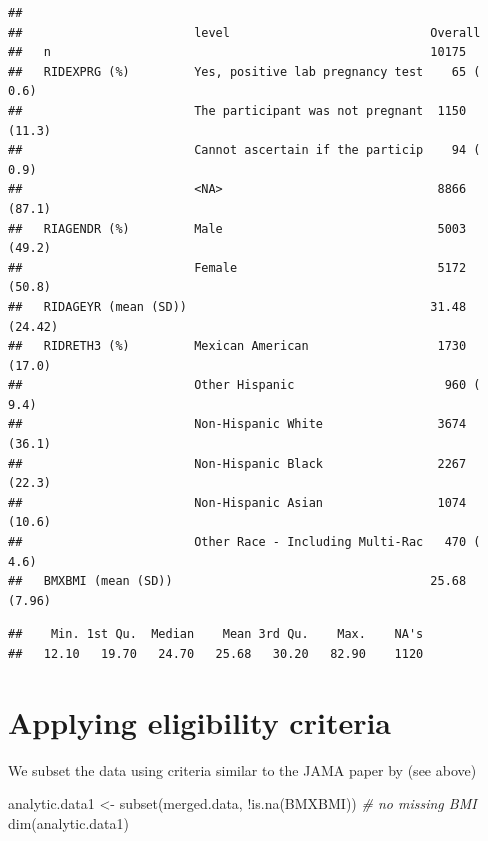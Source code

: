 \documentclass[
]{book}
\newenvironment{Shaded}{\begin{snugshade}}{\end{snugshade}}
\newcommand{\CommentTok}[1]{\textcolor[rgb]{0.56,0.35,0.01}{\textit{#1}}}
\newcommand{\FunctionTok}[1]{\textcolor[rgb]{0.00,0.00,0.00}{#1}}
\newcommand{\NormalTok}[1]{#1}
\newcommand{\OtherTok}[1]{\textcolor[rgb]{0.56,0.35,0.01}{#1}}
\newcommand{\SpecialCharTok}[1]{\textcolor[rgb]{0.00,0.00,0.00}{#1}}
\begin{document}
\begin{verbatim}
##                       
##                        level                            Overall      
##   n                                                     10175        
##   RIDEXPRG (%)         Yes, positive lab pregnancy test    65 ( 0.6) 
##                        The participant was not pregnant  1150 (11.3) 
##                        Cannot ascertain if the particip    94 ( 0.9) 
##                        <NA>                              8866 (87.1) 
##   RIAGENDR (%)         Male                              5003 (49.2) 
##                        Female                            5172 (50.8) 
##   RIDAGEYR (mean (SD))                                  31.48 (24.42)
##   RIDRETH3 (%)         Mexican American                  1730 (17.0) 
##                        Other Hispanic                     960 ( 9.4) 
##                        Non-Hispanic White                3674 (36.1) 
##                        Non-Hispanic Black                2267 (22.3) 
##                        Non-Hispanic Asian                1074 (10.6) 
##                        Other Race - Including Multi-Rac   470 ( 4.6) 
##   BMXBMI (mean (SD))                                    25.68 (7.96)
\end{verbatim}

\begin{Shaded}
\end{Shaded}

\begin{verbatim}
##    Min. 1st Qu.  Median    Mean 3rd Qu.    Max.    NA's 
##   12.10   19.70   24.70   25.68   30.20   82.90    1120
\end{verbatim}

\hypertarget{applying-eligibility-criteria}{%
\section{Applying eligibility criteria}\label{applying-eligibility-criteria}}

We subset the data using criteria similar to the JAMA paper by \citet{flegal2016trends} (see above)

\begin{Shaded}
\begin{Highlighting}[]
\NormalTok{analytic.data1 }\OtherTok{\textless{}{-}} \FunctionTok{subset}\NormalTok{(merged.data, }\SpecialCharTok{!}\FunctionTok{is.na}\NormalTok{(BMXBMI)) }\CommentTok{\# no missing BMI}
\FunctionTok{dim}\NormalTok{(analytic.data1)}
\end{Highlighting}
\end{Shaded}
\end{document}

